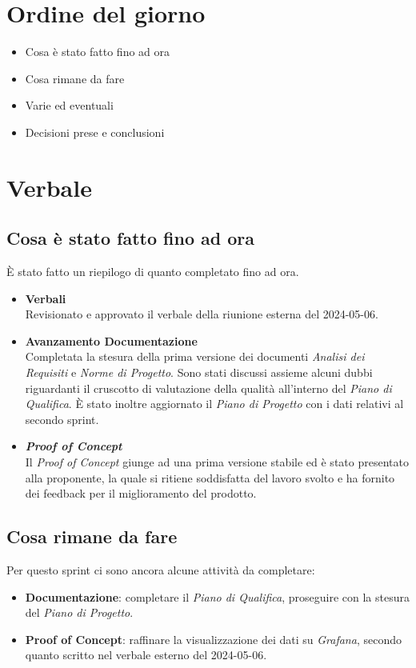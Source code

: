 \documentclass[italian,12pt]{article}
\begin{document}
\section{Ordine del giorno}
\begin{itemize}
	\item Cosa è stato fatto fino ad ora
	\item Cosa rimane da fare
	\item Varie ed eventuali
	\item Decisioni prese e conclusioni
\end{itemize}

\newpage

\section{Verbale}

\subsection{Cosa è stato fatto fino ad ora}
È stato fatto un riepilogo di quanto completato fino ad ora.
\begin{itemize}
	\item \textbf{Verbali} \\
	      Revisionato e approvato il verbale della riunione esterna del 2024-05-06.
	\item \textbf{Avanzamento Documentazione} \\
	      Completata la stesura della prima versione dei documenti \textit{Analisi dei Requisiti} e
	      \textit{Norme di Progetto}. Sono stati discussi assieme alcuni dubbi
	      riguardanti il cruscotto di valutazione della qualità all'interno del \textit{Piano di Qualifica}.
	      È stato inoltre aggiornato il \textit{Piano di Progetto} con i dati relativi al secondo sprint.
	\item \textbf{\textit{Proof of Concept}}\\
	      Il \textit{Proof of Concept} giunge ad una prima versione stabile ed è stato presentato alla proponente,
	      la quale si ritiene soddisfatta del lavoro svolto e ha fornito dei feedback per il miglioramento del prodotto.
\end{itemize}

\subsection{Cosa rimane da fare}
Per questo sprint ci sono ancora alcune attività da completare:
\begin{itemize}
	\item \textbf{Documentazione}: completare il \textit{Piano di Qualifica}, proseguire con la stesura del \textit{Piano di Progetto}.
	\item \textbf{Proof of Concept}: raffinare la visualizzazione dei dati su \textit{Grafana}, secondo quanto scritto nel verbale esterno del 2024-05-06.
\end{itemize}
\end{document}
